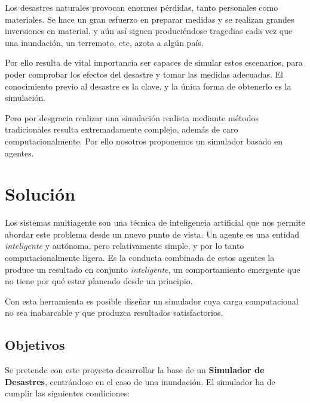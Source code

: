 Los desastres naturales provocan enormes pérdidas, tanto personales como
materiales. Se hace un gran esfuerzo en preparar medidas y se realizan grandes
inversiones en material, y aún así siguen produciéndose tragedias cada vez que
una inundación, un terremoto, etc, azota a algún país.

Por ello resulta de vital importancia ser capaces de simular estos escenarios,
para poder comprobar los efectos del desastre y tomar las medidas adecuadas. El
conocimiento previo al desastre es la clave, y la única forma de obtenerlo es
la simulación.

Pero por desgracia realizar una simulación realista mediante métodos
tradicionales resulta extremadamente complejo, además de caro
computacionalmente. Por ello nosotros proponemos un simulador basado en agentes.

\section*{Solución}

Los sistemas multiagente son una técnica de inteligencia artificial que nos
permite abordar este problema desde un nuevo punto de vista. Un agente es una
entidad {\em inteligente} y autónoma, pero relativamente simple, y por lo tanto
computacionalmente ligera. Es la conducta combinada de estos agentes la produce
un resultado en conjunto {\em inteligente}, un comportamiento emergente que no
tiene por qué estar planeado desde un principio.

Con esta herramienta es posible diseñar un simulador cuya carga computacional
no sea inabarcable y que produzca resultados satisfactorios.

\subsection*{Objetivos}

Se pretende con este proyecto desarrollar la base de un {\bf Simulador de
Desastres}, centrándose en el caso de una inundación. El simulador ha de cumplir
las siguientes condiciones:

